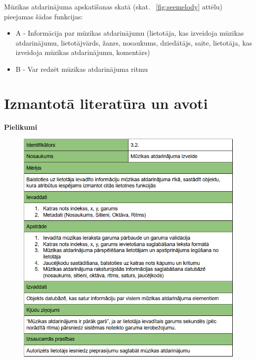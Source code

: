 \documentclass[12pt]{article}
\begin{document}
Mūzikas atdarinājuma apskatīšanas skatā (skat. ~\ref{fig:seemelody} attēlu) pieejamas šādas funkcijas:

\begin{itemize}
	\item A - Informācija par mūzikas atdarinājumu (lietotāja, kas izveidoja mūzikas atdarinājumu, lietotājvārds, žanrs, nosaukums, dziedātājs, saite, lietotāja, kas izveidoja mūzikas atdarinājumu, komentārs)
	\item B - Var redzēt mūzikas atdarinājuma ritmu
\end{itemize}

\pagebreak

\section*{Izmantotā literatūra un avoti}

\printbibliography

\pagebreak

\textbf{\large Pielikumi}

\begin{figure}[H]
\begin{center}
	\includegraphics[scale=0.8]{Capture3.png}
	\label{fig:muzikasPPS}
\end{center}
\end{figure}
\end{document}
